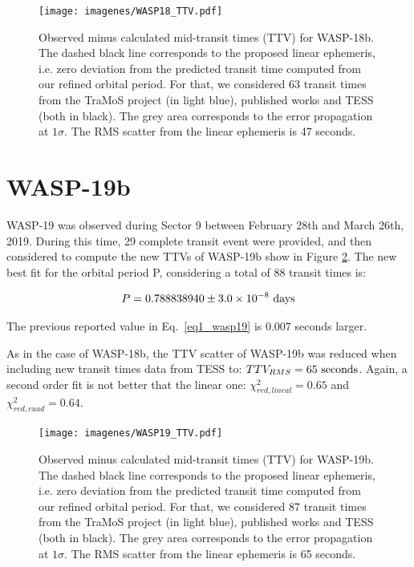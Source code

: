 \begin{figure}[h]
\texttt{[image: imagenes/WASP18\_TTV.pdf]}
\caption{Observed minus calculated mid-transit times (TTV) for WASP-18b. The dashed black line corresponds to the proposed linear ephemeris, i.e. zero deviation from the predicted transit time  computed from our refined orbital period. For that, we considered 63 transit times from the TraMoS project (in light blue), published works and TESS (both in black). The grey area corresponds to the error propagation at $1\sigma$. The RMS scatter from the linear ephemeris is 47 seconds.}
\label{wasp18_ttv}
\end{figure}

\section{WASP-19b}

WASP-19 was observed during Sector 9 between February 28th and March 26th, 2019. During this time, 29 complete transit event were provided, and then considered to compute the new TTVs of WASP-19b show in Figure \ref{wasp19_ttv}. The new best fit for the orbital period P, considering a total of 88 transit times is:

\begin{equation}
P = 0.788838940 \pm 3.0\times10^{-8} ~\rm days
\end{equation}

The previous reported value in Eq.~\ref{eq1_wasp19} is $0.007$ seconds larger.

As in the case of WASP-18b, the TTV scatter of WASP-19b was reduced when including new transit times data from TESS to: $TTV_{RMS}=65~\rm seconds$. Again, a second order fit is not better that the linear one: $\chi^{2}_{red,lineal}= 0.65$ and $\chi^{2}_{red,cuad}= 0.64$. 

\begin{figure}[ht]
\texttt{[image: imagenes/WASP19\_TTV.pdf]}
\caption{Observed minus calculated mid-transit times (TTV) for WASP-19b. The dashed black line corresponds to the proposed linear ephemeris, i.e. zero deviation from the predicted transit time  computed from our refined orbital period. For that, we considered 87 transit times from the TraMoS project (in light blue), published works and TESS (both in black). The grey area corresponds to the error propagation at $1\sigma$. The RMS scatter from the linear ephemeris is 65 seconds.}
\label{wasp19_ttv}
\end{figure}

